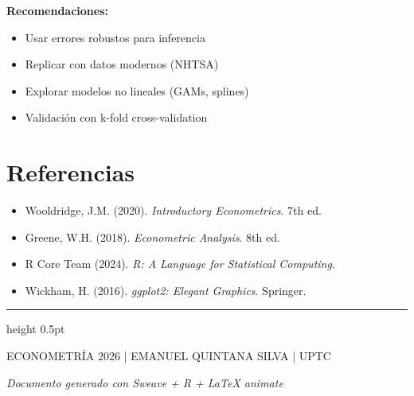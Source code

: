 \documentclass[10pt, spanish]{article}\usepackage[]{graphicx}\usepackage[]{xcolor}
\newcommand{\techfont}{\fontfamily{phv}\selectfont}
\begin{document}
\textbf{Recomendaciones:}
\begin{itemize}[leftmargin=15pt, itemsep=2pt]
\item Usar errores robustos para inferencia
\item Replicar con datos modernos (NHTSA)
\item Explorar modelos no lineales (GAMs, splines)
\item Validación con k-fold cross-validation
\end{itemize}

\section{Referencias}

\begin{itemize}[leftmargin=15pt, itemsep=2pt]
    \item Wooldridge, J.M. (2020). \textit{Introductory Econometrics}. 7th ed.
    \item Greene, W.H. (2018). \textit{Econometric Analysis}. 8th ed.
    \item R Core Team (2024). \textit{R: A Language for Statistical Computing}.
    \item Wickham, H. (2016). \textit{ggplot2: Elegant Graphics}. Springer.
\end{itemize}

\vfill
\hrule height 0.5pt
\vspace{6pt}
\begin{center}
\scriptsize\techfont
\textcolor{VogueBlack}{ECONOMETRÍA 2026} |
\textcolor{Champagne}{EMANUEL QUINTANA SILVA} |
UPTC

\vspace{2pt}
\textit{Documento generado con Sweave + R + LaTeX animate}
\end{center}
\end{document}
